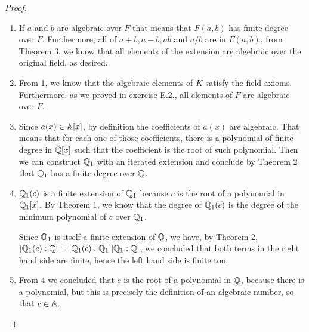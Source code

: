 \begin{proof}
 \begin{enumerate}
     \item If $a$ and $b$ are algebraic over $F$ that means that $F(a,b)$ has finite degree over $F$. Furthermore, all of $a+b,a-b,ab$ and $a/b$ are in $F(a,b)$, from Theorem 3, we know that all elements of the extension are algebraic over the original field, as desired.
     \item From 1, we know that the algebraic elements of $K$ satisfy the field axioms. Furthermore, as we proved in exercise E.2., all elements of $F$ are algebraic over $F$.
     \item Since $a(x)\in\mathbb{A}[x]$, by definition the coefficients of $a(x)$ are algebraic. That means that for each one of those coefficients, there is a polynomial of finite degree in $\mathbb{Q}[x]$ such that the coefficient is the root of such polynomial. Then we can construct $\mathbb{Q}_1$ with an iterated extension and conclude by Theorem 2 that $\mathbb{Q}_1$ has a finite degree over $\mathbb{Q}$.
    \item $\mathbb{Q}_1(c)$ is a finite extension of $\mathbb{Q}_1$ because $c$ is the root of a polynomial in $\mathbb{Q}_1[x]$. By Theorem 1, we know that the degree of $\mathbb{Q}_1(c)$ is the degree of the minimum polynomial of $c$ over $\mathbb{Q}_1$.

    Since $\mathbb{Q}_1$ is itself a finite extension of $\mathbb{Q}$, we have, by Theorem 2, $[\mathbb{Q}_1(c):\mathbb{Q}]=[\mathbb{Q}_1(c):\mathbb{Q}_1][\mathbb{Q}_1:\mathbb{Q}]$, we concluded that both terms in the right hand side are finite, hence the left hand side is finite too.
    \item From 4 we concluded that $c$ is the root of a polynomial in $\mathbb{Q}$, because there is a polynomial, but this is precisely the definition of an algebraic number, so that $c\in\mathbb{A}$.
 \end{enumerate}
\end{proof}